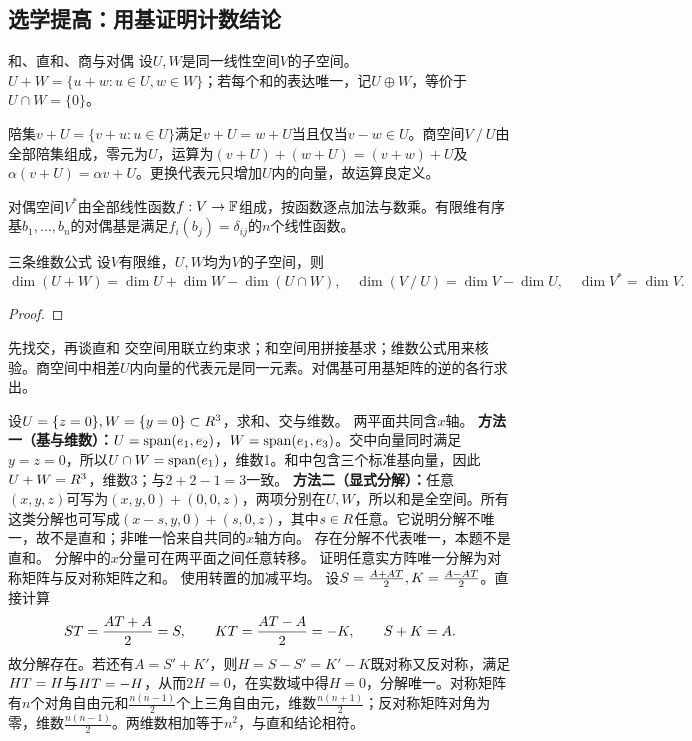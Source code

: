 \subsection{选学提高：用基证明计数结论}
\begin{definition}{和、直和、商与对偶}
设$U,W$是同一线性空间$V$的子空间。$U+W=\{u+w:u\in U,w\in W\}$；若每个和的表达唯一，记$U\oplus W$，等价于$U\cap W=\{0\}$。

陪集$v+U=\{v+u:u\in U\}$满足$v+U=w+U$当且仅当$v-w\in U$。商空间$V\mathbin{\slash}U$由全部陪集组成，零元为$U$，运算为$(v+U)+(w+U)=(v+w)+U$及$\alpha(v+U)=\alpha v+U$。更换代表元只增加$U$内的向量，故运算良定义。

对偶空间$V^*$由全部线性函数$f:V\to\mathbb{F}$组成，按函数逐点加法与数乘。有限维有序基$b_1,\ldots,b_n$的对偶基是满足$f_i(b_j)=\delta_{ij}$的$n$个线性函数。
\end{definition}
\begin{theorem}{三条维数公式}
设$V$有限维，$U,W$均为$V$的子空间，则
\begin{equation}\dim(U+W)=\dim U+\dim W-\dim(U\cap W),\quad
\dim(V\mathbin{\slash}U)=\dim V-\dim U,\quad\dim V^*=\dim V.\end{equation}
\end{theorem}
\begin{proof}

\end{proof}
\begin{method}{先找交，再谈直和}
交空间用联立约束求；和空间用拼接基求；维数公式用来核验。商空间中相差$U$内向量的代表元是同一元素。对偶基可用基矩阵的逆的各行求出。
\end{method}
{设$U=\{z=0\},W=\{y=0\}\subset R^3$，求和、交与维数。}
{两平面共同含$x$轴。}
{\textbf{方法一（基与维数）：}$U=\operatorname{span}(e_1,e_2)$，$W=\operatorname{span}(e_1,e_3)$。交中向量同时满足$y=z=0$，所以$U\cap W=\operatorname{span}(e_1)$，维数1。和中包含三个标准基向量，因此$U+W=R^3$，维数3；与$2+2-1=3$一致。
\textbf{方法二（显式分解）：}任意$(x,y,z)$可写为$(x,y,0)+(0,0,z)$，两项分别在$U,W$，所以和是全空间。所有这类分解也可写成$(x-s,y,0)+(s,0,z)$，其中$s\in R$任意。它说明分解不唯一，故不是直和；非唯一恰来自共同的$x$轴方向。}
{存在分解不代表唯一，本题不是直和。}
{分解中的$x$分量可在两平面之间任意转移。}
{证明任意实方阵唯一分解为对称矩阵与反对称矩阵之和。}
{使用转置的加减平均。}
{设$S=\frac{A+AT}{2},K=\frac{A-AT}{2}$。直接计算
\[ST=\dfrac{AT+A}{2}=S,\qquad KT=\dfrac{AT-A}{2}=-K,\qquad S+K=A.\]
故分解存在。若还有$A=S'+K'$，则$H=S-S'=K'-K$既对称又反对称，满足$HT=H$与$HT=-H$，从而$2H=0$，在实数域中得$H=0$，分解唯一。对称矩阵有$n$个对角自由元和$\frac{n(n-1)}{2}$个上三角自由元，维数$\frac{n(n+1)}{2}$；反对称矩阵对角为零，维数$\frac{n(n-1)}{2}$。两维数相加等于$n^2$，与直和结论相符。}
